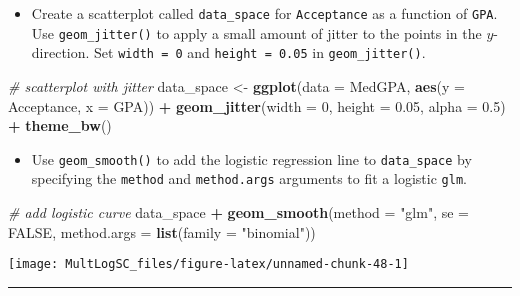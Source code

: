 \documentclass[]{book}
\newenvironment{Shaded}{\begin{snugshade}}{\end{snugshade}}
\newcommand{\KeywordTok}[1]{\textcolor[rgb]{0.13,0.29,0.53}{\textbf{#1}}}
\newcommand{\DataTypeTok}[1]{\textcolor[rgb]{0.13,0.29,0.53}{#1}}
\newcommand{\DecValTok}[1]{\textcolor[rgb]{0.00,0.00,0.81}{#1}}
\newcommand{\FloatTok}[1]{\textcolor[rgb]{0.00,0.00,0.81}{#1}}
\newcommand{\StringTok}[1]{\textcolor[rgb]{0.31,0.60,0.02}{#1}}
\newcommand{\CommentTok}[1]{\textcolor[rgb]{0.56,0.35,0.01}{\textit{#1}}}
\newcommand{\OtherTok}[1]{\textcolor[rgb]{0.56,0.35,0.01}{#1}}
\newcommand{\OperatorTok}[1]{\textcolor[rgb]{0.81,0.36,0.00}{\textbf{#1}}}
\newcommand{\NormalTok}[1]{#1}
\providecommand{\tightlist}{%
  \setlength{\itemsep}{0pt}\setlength{\parskip}{0pt}}
\begin{document}
\begin{itemize}
\tightlist
\item
  Create a scatterplot called \texttt{data\_space} for
  \texttt{Acceptance} as a function of \texttt{GPA}. Use
  \texttt{geom\_jitter()} to apply a small amount of jitter to the
  points in the \(y\)-direction. Set \texttt{width\ =\ 0} and
  \texttt{height\ =\ 0.05} in \texttt{geom\_jitter()}.
\end{itemize}

\begin{Shaded}
\begin{Highlighting}[]
\CommentTok{# scatterplot with jitter}
\NormalTok{data_space <-}\StringTok{ }\KeywordTok{ggplot}\NormalTok{(}\DataTypeTok{data =}\NormalTok{ MedGPA, }\KeywordTok{aes}\NormalTok{(}\DataTypeTok{y =}\NormalTok{ Acceptance, }\DataTypeTok{x =}\NormalTok{ GPA)) }\OperatorTok{+}\StringTok{ }
\StringTok{  }\KeywordTok{geom_jitter}\NormalTok{(}\DataTypeTok{width =} \DecValTok{0}\NormalTok{, }\DataTypeTok{height =} \FloatTok{0.05}\NormalTok{, }\DataTypeTok{alpha =} \FloatTok{0.5}\NormalTok{) }\OperatorTok{+}\StringTok{ }
\StringTok{  }\KeywordTok{theme_bw}\NormalTok{()}
\end{Highlighting}
\end{Shaded}

\begin{itemize}
\tightlist
\item
  Use \texttt{geom\_smooth()} to add the logistic regression line to
  \texttt{data\_space} by specifying the \texttt{method} and
  \texttt{method.args} arguments to fit a logistic \texttt{glm}.
\end{itemize}

\begin{Shaded}
\begin{Highlighting}[]
\CommentTok{# add logistic curve}
\NormalTok{data_space }\OperatorTok{+}
\StringTok{  }\KeywordTok{geom_smooth}\NormalTok{(}\DataTypeTok{method =} \StringTok{"glm"}\NormalTok{, }\DataTypeTok{se =} \OtherTok{FALSE}\NormalTok{, }\DataTypeTok{method.args =} \KeywordTok{list}\NormalTok{(}\DataTypeTok{family =} \StringTok{"binomial"}\NormalTok{))}
\end{Highlighting}
\end{Shaded}

\begin{center}\texttt{[image: MultLogSC\_files/figure-latex/unnamed-chunk-48-1]} \end{center}

\begin{center}\rule{0.5\linewidth}{\linethickness}\end{center}
\end{document}
